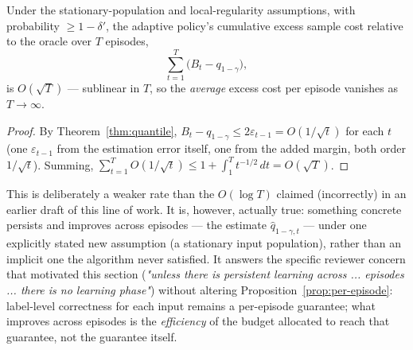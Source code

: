 \begin{theorem}
\label{thm:excess-cost}
Under the stationary-population and local-regularity assumptions, with probability $\geq 1-\delta'$, the adaptive policy's cumulative excess sample cost relative to the oracle over $T$ episodes,
$$
\sum_{t=1}^{T} \big(B_t - q_{1-\gamma}\big),
$$
is $O(\sqrt{T})$ — sublinear in $T$, so the \emph{average} excess cost per episode vanishes as $T \to \infty$.
\end{theorem}

\begin{proof}
By Theorem~\ref{thm:quantile}, $B_t - q_{1-\gamma} \leq 2\varepsilon_{t-1} = O(1/\sqrt{t})$ for each $t$ (one $\varepsilon_{t-1}$ from the estimation error itself, one from the added margin, both order $1/\sqrt{t}$). Summing, $\sum_{t=1}^T O(1/\sqrt{t}) \leq 1 + \int_1^T t^{-1/2}\,dt = O(\sqrt{T})$.
\end{proof}

\begin{remark}
This is deliberately a weaker rate than the $O(\log T)$ claimed (incorrectly) in an earlier draft of this line of work. It is, however, actually true: something concrete persists and improves across episodes — the estimate $\hat q_{1-\gamma,t}$ — under one explicitly stated new assumption (a stationary input population), rather than an implicit one the algorithm never satisfied. It answers the specific reviewer concern that motivated this section (\emph{"unless there is persistent learning across ... episodes ... there is no learning phase"}) without altering Proposition~\ref{prop:per-episode}: label-level correctness for each input remains a per-episode guarantee; what improves across episodes is the \emph{efficiency} of the budget allocated to reach that guarantee, not the guarantee itself.
\end{remark}
